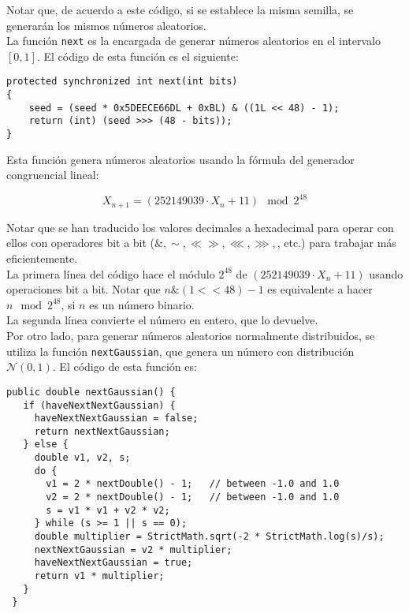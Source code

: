\documentclass[12pt,a4paper,twoside,openright,titlepage,final]{article}
\begin{document}
Notar que, de acuerdo a este código, si se establece la misma semilla, se generarán los mismos números aleatorios.\\

La función \texttt{next} es la encargada de generar números aleatorios en el intervalo $[0,1]$. El código de esta función es el siguiente:

\begin{verbatim}
protected synchronized int next(int bits)
{
	seed = (seed * 0x5DEECE66DL + 0xBL) & ((1L << 48) - 1);
	return (int) (seed >>> (48 - bits));
}
\end{verbatim}

Esta función genera números aleatorios usando la fórmula del generador congruencial lineal:

\[ X_{n+1} = (252149039 \cdot X_n + 11) \mod 2^{48} \]

Notar que se han traducido los valores decimales a hexadecimal para operar con ellos con operadores bit a bit ($\&,\sim, \ll \gg, \lll, \ggg,$, etc.) para trabajar más eficientemente.\\

La primera línea del código hace el módulo $2^{48}$ de $(252149039 \cdot X_n + 11)$ usando operaciones bit a bit. Notar que $n \& (1 << 48) - 1$ es equivalente a hacer $n \mod 2^{48}$, si $n$ es un número binario.\\

La segunda línea convierte el número en entero, que lo devuelve.\\

Por otro lado, para generar números aleatorios normalmente distribuidos, se utiliza la función \texttt{nextGaussian}, que genera un número con distribución $\mathcal{N}(0,1)$. El código de esta función es:

\begin{verbatim}
public double nextGaussian() {
   if (haveNextNextGaussian) {
     haveNextNextGaussian = false;
     return nextNextGaussian;
   } else {
     double v1, v2, s;
     do {
       v1 = 2 * nextDouble() - 1;   // between -1.0 and 1.0
       v2 = 2 * nextDouble() - 1;   // between -1.0 and 1.0
       s = v1 * v1 + v2 * v2;
     } while (s >= 1 || s == 0);
     double multiplier = StrictMath.sqrt(-2 * StrictMath.log(s)/s);
     nextNextGaussian = v2 * multiplier;
     haveNextNextGaussian = true;
     return v1 * multiplier;
   }
 }
\end{verbatim}
\end{document}

